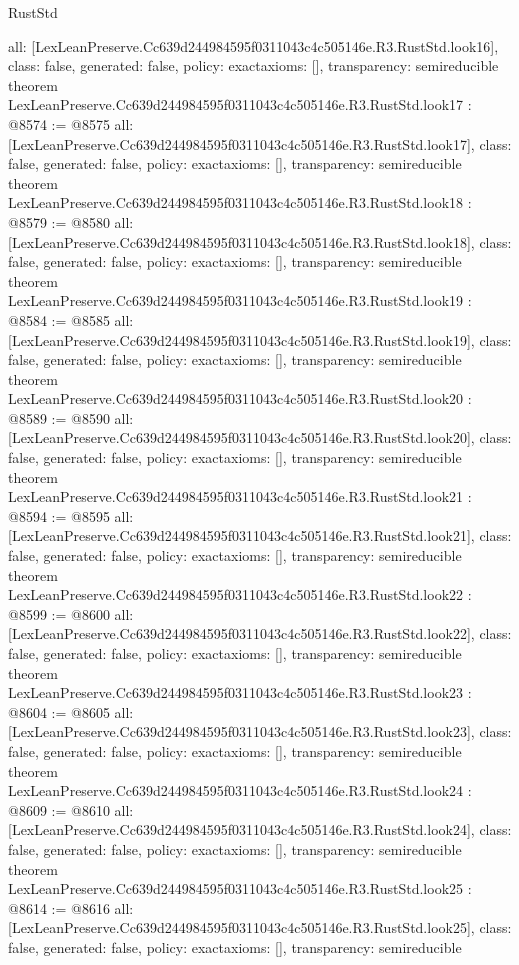 \begin{lexlean}{RustStd}
\begin{coremodule}
{  all: [LexLeanPreserve.Cc639d244984595f0311043c4c505146e.R3.RustStd.look16],
  class: false,
  generated: false,
  policy: exact{axioms: []},
  transparency: semireducible
}
theorem LexLeanPreserve.Cc639d244984595f0311043c4c505146e.R3.RustStd.look17 : @8574 := @8575 {
  all: [LexLeanPreserve.Cc639d244984595f0311043c4c505146e.R3.RustStd.look17],
  class: false,
  generated: false,
  policy: exact{axioms: []},
  transparency: semireducible
}
theorem LexLeanPreserve.Cc639d244984595f0311043c4c505146e.R3.RustStd.look18 : @8579 := @8580 {
  all: [LexLeanPreserve.Cc639d244984595f0311043c4c505146e.R3.RustStd.look18],
  class: false,
  generated: false,
  policy: exact{axioms: []},
  transparency: semireducible
}
theorem LexLeanPreserve.Cc639d244984595f0311043c4c505146e.R3.RustStd.look19 : @8584 := @8585 {
  all: [LexLeanPreserve.Cc639d244984595f0311043c4c505146e.R3.RustStd.look19],
  class: false,
  generated: false,
  policy: exact{axioms: []},
  transparency: semireducible
}
theorem LexLeanPreserve.Cc639d244984595f0311043c4c505146e.R3.RustStd.look20 : @8589 := @8590 {
  all: [LexLeanPreserve.Cc639d244984595f0311043c4c505146e.R3.RustStd.look20],
  class: false,
  generated: false,
  policy: exact{axioms: []},
  transparency: semireducible
}
theorem LexLeanPreserve.Cc639d244984595f0311043c4c505146e.R3.RustStd.look21 : @8594 := @8595 {
  all: [LexLeanPreserve.Cc639d244984595f0311043c4c505146e.R3.RustStd.look21],
  class: false,
  generated: false,
  policy: exact{axioms: []},
  transparency: semireducible
}
theorem LexLeanPreserve.Cc639d244984595f0311043c4c505146e.R3.RustStd.look22 : @8599 := @8600 {
  all: [LexLeanPreserve.Cc639d244984595f0311043c4c505146e.R3.RustStd.look22],
  class: false,
  generated: false,
  policy: exact{axioms: []},
  transparency: semireducible
}
theorem LexLeanPreserve.Cc639d244984595f0311043c4c505146e.R3.RustStd.look23 : @8604 := @8605 {
  all: [LexLeanPreserve.Cc639d244984595f0311043c4c505146e.R3.RustStd.look23],
  class: false,
  generated: false,
  policy: exact{axioms: []},
  transparency: semireducible
}
theorem LexLeanPreserve.Cc639d244984595f0311043c4c505146e.R3.RustStd.look24 : @8609 := @8610 {
  all: [LexLeanPreserve.Cc639d244984595f0311043c4c505146e.R3.RustStd.look24],
  class: false,
  generated: false,
  policy: exact{axioms: []},
  transparency: semireducible
}
theorem LexLeanPreserve.Cc639d244984595f0311043c4c505146e.R3.RustStd.look25 : @8614 := @8616 {
  all: [LexLeanPreserve.Cc639d244984595f0311043c4c505146e.R3.RustStd.look25],
  class: false,
  generated: false,
  policy: exact{axioms: []},
  transparency: semireducible
}
\end{coremodule}
\end{lexlean}
